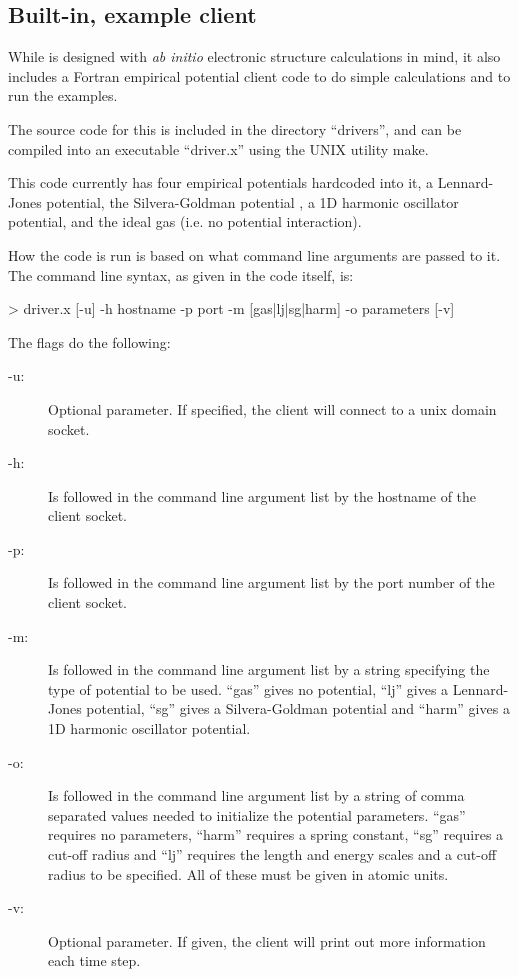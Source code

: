 \documentclass[11pt,english,fleqn]{report}
\newenvironment{code}{%
\footnotesize 
\verbatim
}{
\endverbatim
\normalsize
}
\begin{document}
\label{runningclients}

\subsection{Built-in, example client}

\label{driver.x}

While \ipi is designed with \emph{ab initio} electronic structure calculations
in mind, it also includes a Fortran empirical potential client code to do 
simple calculations and to run the examples.

The source code for this is included in the directory {}``drivers'', and can
be compiled into an executable {}``driver.x'' using the UNIX utility make.

This code currently has four empirical potentials hardcoded into it, 
a Lennard-Jones potential, the Silvera-Goldman potential \cite{silv-gold78jcp},
a 1D harmonic oscillator potential, and the ideal gas (i.e. no potential
interaction).

How the code is run is based on what command line arguments are passed to it.
The command line syntax, as given in the code itself, is:

\begin{code}
> driver.x [-u] -h hostname -p port -m [gas|lj|sg|harm] -o parameters [-v]
\end{code}

The flags do the following:

\begin{description}
\item[-u:] Optional parameter. If specified, the client will connect to
a unix domain socket.
\item[-h:] Is followed in the command line argument list by the hostname
of the client socket.
\item[-p:] Is followed in the command line argument list by the port number
of the client socket.
\item[-m:] Is followed in the command line argument list by a string
specifying the type of potential to be used. {}``gas'' gives no potential,
{}``lj'' gives a Lennard-Jones potential, {}``sg'' gives a Silvera-Goldman
potential and {}``harm'' gives a 1D harmonic oscillator potential.
\item[-o:] Is followed in the command line argument list by a string of
comma separated values needed to initialize the potential parameters.
{}``gas'' requires no parameters, {}``harm'' requires a spring constant,
{}``sg'' requires a cut-off radius and {}``lj'' requires the length and
energy scales and a cut-off radius to be specified. All of these must
be given in atomic units.
\item[-v:] Optional parameter. If given, the client will print out
more information each time step.
\end{description}
\end{document}
